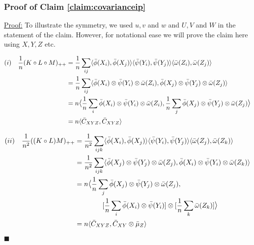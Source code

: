 \documentclass[12pt]{article}
\newenvironment{claimproof}[1]{\par\noindent\underline{Proof:}\space#1}{\hfill $\blacksquare$}
\numberwithin{claim}{section}
\numberwithin{lemma}{section}
\numberwithin{theorem}{section}
\begin{document}
\subsubsection*{Proof of Claim \ref{claim:covarianceip}}
\begin{claimproof}\label{proof:gram2cov}
To illustrate the symmetry, we used $u,v$ and $w$ and $U, V$ and $W$ in the statement of the claim. However, for notational ease we will prove the claim here using $X,Y,Z$ etc.



\begin{align*}
(i) && \frac{1}{n}(K\circ L \circ M)_{++} &= \frac{1}{n} \sum_{ij} \langle \bar{\phi}(X_i),\bar{\phi}(X_j) \rangle  \langle \bar{\psi}(Y_i),\bar{\psi}(Y_j) \rangle  \langle \bar{\omega}(Z_i),\bar{\omega}(Z_j) \rangle\\
&&& =\frac{1}{n} \sum_{ij} \langle \bar{\phi}(X_i)\otimes\bar{\psi}(Y_i) \otimes  \bar{\omega}(Z_i),\bar{\phi}(X_j)\otimes \bar{\psi}(Y_j) \otimes \bar{\omega}(Z_j) \rangle\\
&&& = n  \mathlarger{\langle} \frac{1}{n} \sum_{i}\bar{\phi}(X_i)\otimes\bar{\psi}(Y_i) \otimes  \bar{\omega}(Z_i),\frac{1}{n}\sum_{j}\bar{\phi}(X_j)\otimes \bar{\psi}(Y_j) \otimes \bar{\omega}(Z_j) \mathlarger{\rangle}\\
&&& = n\langle \bar{C}_{XYZ},\bar{C}_{XYZ} \rangle\\
\end{align*}

\begin{align*}
(ii) && \frac{1}{n^2}((K\circ L)M)_{++} &= \frac{1}{n^2} \sum_{ijk} \langle \bar{\phi}(X_i),\bar{\phi}(X_j) \rangle  \langle \bar{\psi}(Y_i),\bar{\psi}(Y_j) \rangle  \langle \bar{\omega}(Z_j),\bar{\omega}(Z_k) \rangle\\
&&& =\frac{1}{n^2} \sum_{ijk} \langle \bar{\phi}(X_j)\otimes\bar{\psi}(Y_j) \otimes  \bar{\omega}(Z_j),\bar{\phi}(X_i)\otimes \bar{\psi}(Y_i) \otimes \bar{\omega}(Z_k) \rangle\\
&&& = n  \mathlarger{\langle} \frac{1}{n} \sum_{j}\bar{\phi}(X_j)\otimes\bar{\psi}(Y_j) \otimes  \bar{\omega}(Z_j),\\&&&\quad\quad\quad\quad[\frac{1}{n}\sum_{i}\bar{\phi}(X_i)\otimes \bar{\psi}(Y_i)] \otimes [\frac{1}{n} \sum_k \bar{\omega}(Z_k)]\mathlarger{\rangle}\\
&&& = n\langle \bar{C}_{XYZ},\bar{C}_{XY}\otimes \bar{\mu}_Z \rangle\\
\end{align*}


\end{claimproof}
\end{document}
